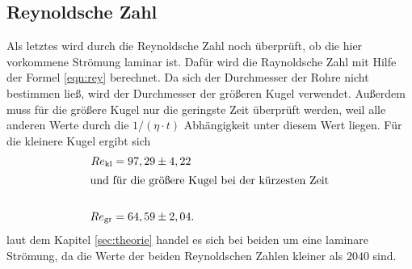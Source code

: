 \subsection{Reynoldsche Zahl}
\label{sec:rey}
Als letztes wird durch die Reynoldsche Zahl noch überprüft,
ob die hier vorkommene Strömung laminar ist.
Dafür wird die Raynoldsche Zahl mit Hilfe der Formel \eqref{eqn:rey} berechnet.
Da sich der Durchmesser der Rohre nicht bestimmen ließ, wird der Durchmesser
der größeren Kugel verwendet. Außerdem muss für die größere Kugel
nur die geringste Zeit überprüft werden, weil alle
anderen Werte durch die $1/(\eta\cdot t)$ Abhängigkeit unter diesem Wert liegen.
Für die kleinere Kugel ergibt sich
\begin{align}
Re_{\mathrm{kl}}&=97,29\pm4,22\\
\intertext{und für die größere Kugel bei der kürzesten Zeit}\\
Re_{\mathrm{gr}}&=64,59\pm2,04 .
\end{align}
laut dem Kapitel \ref{sec:theorie} handel es sich bei beiden
um eine laminare Strömung, da die Werte der beiden Reynoldschen Zahlen kleiner als $2040$ sind.
